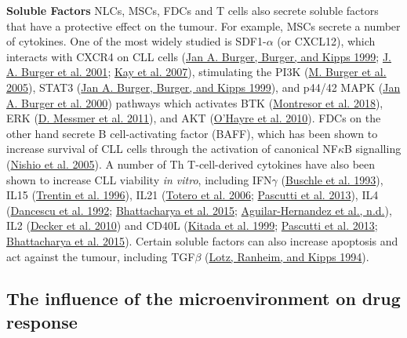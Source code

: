 \documentclass[11pt, a4paper, twosided]{book}
\begin{document}
\textbf{Soluble Factors}
NLCs, MSCs, FDCs and T cells also secrete soluble factors that have a protective effect on the tumour. For example, MSCs secrete a number of cytokines. One of the most widely studied is SDF1-\(\alpha\) (or CXCL12), which interacts with CXCR4 on CLL cells (\protect\hyperlink{ref-Burger1999}{Jan A. Burger, Burger, and Kipps 1999}; \protect\hyperlink{ref-Burger2001}{J. A. Burger et al. 2001}; \protect\hyperlink{ref-Kay2007}{Kay et al. 2007}), stimulating the PI3K (\protect\hyperlink{ref-Burger2005}{M. Burger et al. 2005}), STAT3 (\protect\hyperlink{ref-Burger1999}{Jan A. Burger, Burger, and Kipps 1999}), and p44/42 MAPK (\protect\hyperlink{ref-Burger2000}{Jan A. Burger et al. 2000}) pathways which activates BTK (\protect\hyperlink{ref-Montresor2018}{Montresor et al. 2018}), ERK (\protect\hyperlink{ref-Messmer2011}{D. Messmer et al. 2011}), and AKT (\protect\hyperlink{ref-OHayre2010}{O'Hayre et al. 2010}). FDCs on the other hand secrete B cell-activating factor (BAFF), which has been shown to increase survival of CLL cells through the activation of canonical NF\(\kappa\)B signalling (\protect\hyperlink{ref-Nishio2005}{Nishio et al. 2005}). A number of Th T-cell-derived cytokines have also been shown to increase CLL viability \emph{in vitro}, including IFN\(\gamma\) (\protect\hyperlink{ref-Buschle1993}{Buschle et al. 1993}), IL15 (\protect\hyperlink{ref-Trentin1996}{Trentin et al. 1996}), IL21 (\protect\hyperlink{ref-deTotero2006}{Totero et al. 2006}; \protect\hyperlink{ref-Pascutti2013}{Pascutti et al. 2013}), IL4 (\protect\hyperlink{ref-Dancescu1992}{Dancescu et al. 1992}; \protect\hyperlink{ref-Bhattacharya2015}{Bhattacharya et al. 2015}; \protect\hyperlink{ref-AguilarHernandez2016}{Aguilar-Hernandez et al., n.d.}), IL2 (\protect\hyperlink{ref-Decker2010}{Decker et al. 2010}) and CD40L (\protect\hyperlink{ref-Kitada1999}{Kitada et al. 1999}; \protect\hyperlink{ref-Pascutti2013}{Pascutti et al. 2013}; \protect\hyperlink{ref-Bhattacharya2015}{Bhattacharya et al. 2015}). Certain soluble factors can also increase apoptosis and act against the tumour, including TGF\(\beta\) (\protect\hyperlink{ref-Lotz1994}{Lotz, Ranheim, and Kipps 1994}).

\hypertarget{intro-microenvironment-drug-response}{%
\subsection{The influence of the microenvironment on drug response}\label{intro-microenvironment-drug-response}}
\end{document}

